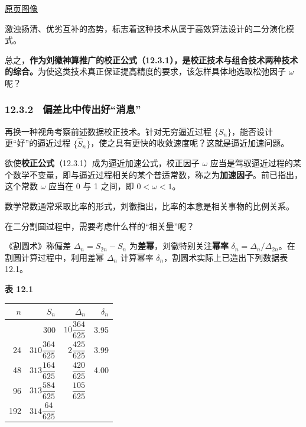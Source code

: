 \documentclass[
  10pt,
  fontset=fandol]{ctexart}
\newcounter{none} %
\begin{document}
\href{../../source-images/pdf-299.jpeg}{原页图像}

激浊扬清、优劣互补的态势，标志着这种技术从属于高效算法设计的二分演化模式。

总之，\textbf{作为刘徽神算推广的校正公式（12.3.1），是校正技术与组合技术两种技术的综合。}为使这类技术真正保证提高精度的要求，该怎样具体地选取松弛因子 \(\omega\) 呢？

\subsubsection{12.3.2　偏差比中传出好``消息''}\label{ux504fux5deeux6bd4ux4e2dux4f20ux51faux597dux6d88ux606f}

再换一种视角考察前述数据校正技术。针对无穷逼近过程 \(\{S_n\}\)，能否设计更``好''的逼近过程 \(\{\widehat S_n\}\)，使之具有更快的收敛速度呢？这就是逼近加速问题。

欲使\textbf{校正公式}（12.3.1）成为逼近加速公式，校正因子 \(\omega\) 应当是驾驭逼近过程的某个数学不变量，即与逼近过程相关的某个普适常数，称之为\textbf{加速因子}。前已指出，这个常数 \(\omega\) 应当在 0 与 1 之间，即 \(0<\omega<1\)。

数学常数通常采取比率的形式，刘徽指出，比率的本意是相关事物的比例关系。

在二分割圆过程中，需要考虑什么样的``相关量''呢？

《割圆术》称偏差 \(\Delta_n=S_{2n}-S_n\) 为\textbf{差幂}，刘徽特别关注\textbf{幂率} \(\delta_n=\Delta_n/\Delta_{2n}\)。在割圆计算过程中，利用差幂 \(\Delta_n\) 计算幂率 \(\delta_n\)，割圆术实际上已造出下列数据表 12.1。

\textbf{表 12.1}

\begingroup
\renewcommand{\arraystretch}{2.2}

{\def\LTcaptype{none} %
\begin{longtable}[]{@{}rrrr@{}}
\toprule\noalign{}
\(n\) & \(S_n\) & \(\Delta_n\) & \(\delta_n\) \\
\midrule\noalign{}
\endhead
\bottomrule\noalign{}
\endlastfoot
12 & 300 & \(10\dfrac{364}{625}\) & 3.95 \\
24 & \(310\dfrac{364}{625}\) & \(2\dfrac{425}{625}\) & 3.99 \\
48 & \(313\dfrac{164}{625}\) & \(\dfrac{420}{625}\) & 4.00 \\
96 & \(313\dfrac{584}{625}\) & \(\dfrac{105}{625}\) & \\
192 & \(314\dfrac{64}{625}\) & & \\
\end{longtable}
}
\end{document}
